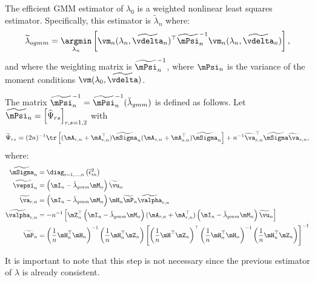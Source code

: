 \documentclass[english,12pt]{book}\usepackage[]{graphicx}\usepackage[]{xcolor}
\begin{document}
The efficient GMM estimator of $\lambda_0$ is a weighted nonlinear least squares estimator. Specifically, this estimator is $\widetilde{\lambda}_n$ where:
\begin{equation}\label{eq:nonlinear-gmm-lambda}
\widetilde{\lambda}_{ogmm} = \underset{\lambda_n}{\argmin} \left[\vm_n(\lambda_n,\widetilde{\vdelta}_n)^\top\widetilde{\mPsi}^{-1}_n\vm_n(\lambda_n,\widetilde{\vdelta}_n) \right],
\end{equation}
%
and where the weighting matrix is $\widetilde{\mPsi}^{-1}_n$, where $\mPsi_n$ is the variance of the moment conditions $\vm(\lambda_0,\widetilde{\vdelta})$. 


The matrix $\widetilde{\mPsi}^{-1}_n= \widetilde{\mPsi}^{-1}_n (\breve{\lambda}_{gmm})$ is defined as follows. Let $\widetilde{\mPsi}_n = \left[\widehat{\Psi}_{rs}\right]_{r,s = 1, 2}$ with
\begin{equation*}
\widetilde{\Psi}_{rs} = (2n)^{-1}\tr\left[(\mA_{r, n} + \mA_{r, n}^\top)\widetilde{\mSigma}_n(\mA_{s, n} + \mA_{s, n}^\top)\widetilde{\mSigma}_n\right] + n^{-1}\widetilde{\va}_{r, n}^\top\widetilde{\mSigma}\widetilde{\va}_{s, n},
\end{equation*}
%
where:
\begin{equation*}
  \begin{aligned}
    \widetilde{\mSigma}_n  & = \diag_{i=1, \ldots,n}\left(\widetilde{\epsilon}_{in}^2\right) \\
    \widetilde{\vepsi}_n   & = \left(\mI_n - \breve{\lambda}_{gmm}\mM_n\right)\widetilde{\vu}_n \\
    \widetilde{\va}_{r,n} & = \left(\mI_n - \breve{\lambda}_{gmm}\mM_n\right)\mH_n\widetilde{\mP}_n\widetilde{\valpha}_{r,n} \\
    \widetilde{\valpha}_{r,n} & = - n^{-1}\left[\mZ^\top_n\left(\mI_n - \breve{\lambda}_{gmm}\mM _n\right)(\mA_{r, n} + \mA_{r, n}^\top)\left(\mI_n - \breve{\lambda}_{gmm}\mM_n\right)\widetilde{\vu}_n\right] \\
    \widetilde{\mP}_n & = \left(\frac{1}{n}\mH^\top_n\mH_n\right)^{-1}\left(\frac{1}{n}\mH_n^\top\mZ_n \right)\left[\left(\frac{1}{n}\mH^\top\mZ_n\right)^\top\left(\frac{1}{n}\mH^\top_n\mH_n\right)^{-1}\left(\frac{1}{n}\mH^\top_n\mZ_n\right)\right]^{-1}
  \end{aligned}
\end{equation*}

It is important to note that this step is not necessary since the previous estimator of $\lambda$ is already consistent. 
\end{document}
